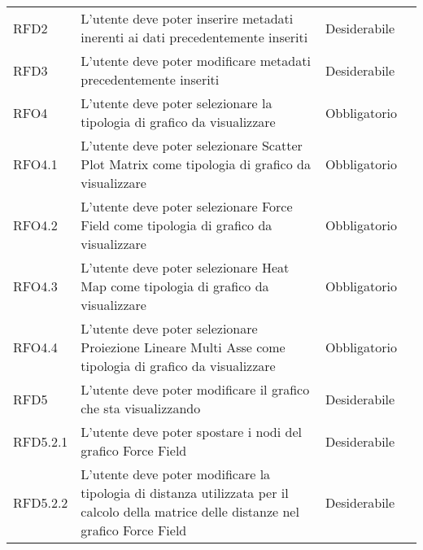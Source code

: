 \begin{longtable}[H]{|>{\raggedright\arraybackslash}p{20mm} | p{90mm} | p{22mm} | p{30mm} |}
    RFD2 
        & L'utente deve poter inserire metadati inerenti ai dati precedentemente inseriti 
        & Desiderabile 
        & \\
    RFD3 
        & L'utente deve poter modificare metadati precedentemente inseriti 
        & Desiderabile 
        & \\
    RFO4 
        & L'utente deve poter selezionare la tipologia di grafico da visualizzare 
        & Obbligatorio 
        & \\
    RFO4.1 
        & L'utente deve poter selezionare Scatter Plot Matrix come tipologia di grafico da visualizzare 
        & Obbligatorio 
        & \\
    RFO4.2 
        & L'utente deve poter selezionare Force Field come tipologia di grafico da visualizzare 
        & Obbligatorio 
        & \\
    RFO4.3 
        & L'utente deve poter selezionare Heat Map come tipologia di grafico da visualizzare 
        & Obbligatorio 
        & \\
    RFO4.4 
        & L'utente deve poter selezionare Proiezione Lineare Multi Asse come tipologia di grafico da visualizzare 
        & Obbligatorio 
        & \\
    RFD5 
        & L'utente deve poter modificare il grafico che sta visualizzando 
        & Desiderabile 
        & \\
    

    RFD5.2.1 
        & L'utente deve poter spostare i nodi del grafico Force Field 
        & Desiderabile 
        & \\

    RFD5.2.2 
        & L'utente deve poter modificare la tipologia di distanza utilizzata per il calcolo della matrice delle 
        distanze nel grafico Force Field 
        & Desiderabile 
        & \\


\end{longtable}
